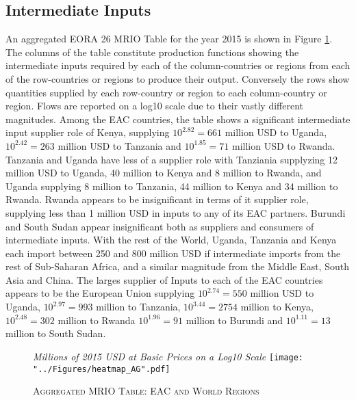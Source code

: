 \documentclass[a4paper]{article}
\begin{document}
\subsection{Intermediate Inputs}
An aggregated EORA 26 MRIO Table for the year 2015 is shown in Figure \ref{fig:wld}.  The columns of the table constitute production functions showing the intermediate inputs required by each of the column-countries or regions from each of the row-countries or regions to produce their output. Conversely the rows show quantities supplied by each row-country or region to each column-country or region. Flows are reported on a log10 scale due to their vastly different magnitudes. Among the EAC countries, the table shows a significant intermediate input supplier role of Kenya, supplying $10^{2.82} = 661$ million USD to Uganda, $10^{2.42} = 263$ million USD to Tanzania and  $10^{1.85} = 71$ million USD to Rwanda. Tanzania and Uganda have less of a supplier role with Tanziania supplyzing 12 million USD to Uganda, 40 million to Kenya and 8 million to Rwanda, and Uganda supplying 8 million to Tanzania, 44 million to Kenya and 34 million to Rwanda. Rwanda appears to be insignificant in terms of it supplier role, supplying less than 1 million USD in inputs to any of its EAC partners. Burundi and South Sudan appear insignificant both as suppliers and consumers of intermediate inputs. With the rest of the World, Uganda, Tanzania and Kenya each import between 250 and 800 million USD if intermediate imports from the rest of Sub-Saharan Africa, and a similar magnitude from the Middle East, South Asia and China. The larges supplier of Inputs to each of the EAC countries appears to be the European Union supplying $10^{2.74} = 550$ million USD to Uganda, $10^{2.97} = 993$ million to Tanzania, $10^{3.44} = 2754$ million to Kenya, $10^{2.48} = 302$ million to Rwanda  $10^{1.96} = 91$ million to Burundi and $10^{1.11} = 13$ million to South Sudan. 

\begin{figure}[h!]
\centering
\caption{\label{fig:wld}\textsc{Aggregated MRIO Table: EAC and World Regions}}
\small{\textit{Millions of 2015 USD at Basic Prices on a Log10 Scale}}
\texttt{[image: "../Figures/heatmap\_AG".pdf]} %
\end{figure}
\FloatBarrier
\end{document}
